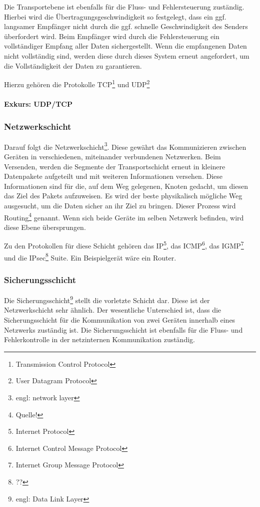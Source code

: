 \documentclass[12pt]{article}
\begin{document}
	Die Transportebene ist ebenfalls für die Fluss- und Fehlersteuerung zuständig. Hierbei wird die Übertragungsgeschwindigkeit so festgelegt, dass ein ggf. langsamer Empfänger nicht durch die ggf. schnelle Geschwindigkeit des Senders überfordert wird. Beim Empfänger wird durch die Fehlersteuerung ein vollständiger Empfang aller Daten sichergestellt. Wenn die empfangenen Daten nicht vollständig sind, werden diese durch dieses System erneut angefordert, um die Vollständigkeit der Daten zu garantieren. 
	
	Hierzu gehören die Protokolle TCP\footnote{Transmission Control Protocol} und UDP\footnote{User Datagram Protocol}

\paragraph{Exkurs: UDP/TCP}
   
   
\subsubsection{Netzwerkschicht}
	Darauf folgt die Netzwerkschicht\footnote{engl: network layer}. Diese gewährt das Kommunizieren zwischen Geräten in verschiedenen, miteinander verbundenen Netzwerken. Beim Versenden, werden die Segmente der Transportschicht erneut in kleinere Datenpakete aufgeteilt und mit weiteren Informationen versehen. Diese Informationen sind für die, auf dem Weg gelegenen, Knoten gedacht, um diesen das Ziel des Pakets aufzuweisen. Es wird der beste physikalisch mögliche Weg ausgesucht, um die Daten sicher an ihr Ziel zu bringen. Dieser Prozess wird Routing\footnote{Quelle!} genannt.
	Wenn sich beide Geräte im selben Netzwerk befinden, wird diese Ebene übersprungen. 
	
	Zu den Protokollen für diese Schicht gehören das IP\footnote{Internet Protocol}, das ICMP\footnote{Internet Control Message Protocol}, das IGMP\footnote{Internet Group Message Protocol} und die IPsec\footnote{??} Suite. Ein Beispielgerät wäre ein Router.
	
\subsubsection{Sicherungsschicht}
	Die Sicherungsschicht\footnote{engl: Data Link Layer} stellt die vorletzte Schicht dar. Diese ist der Netzwerkschicht sehr ähnlich. Der wesentliche Unterschied ist, dass die Sicherungsschicht für die Kommunikation von zwei Geräten innerhalb eines Netzwerks zuständig ist. Die Sicherungsschicht ist ebenfalls für die Fluss- und Fehlerkontrolle in der netzinternen Kommunikation zuständig. 
	
\end{document}
